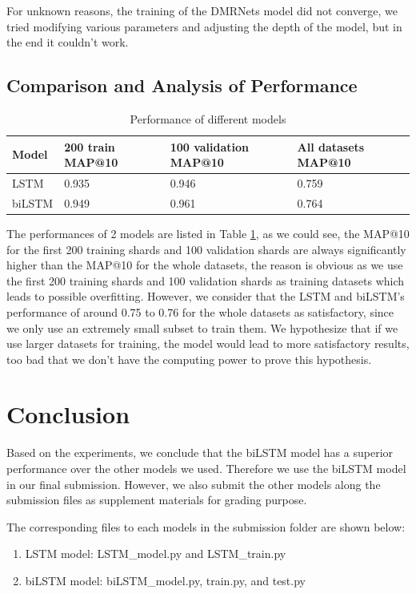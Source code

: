 \documentclass{article}
\begin{document}
For unknown reasons, the training of the DMRNets model did not converge, we tried modifying various parameters and adjusting the depth of the model, but in the end it couldn't work.

\subsection{Comparison and Analysis of Performance}
\begin{table} [H]
  \caption{Performance of different models}
  \label{table 1}
  \centering
  \begin{tabular}{llll}
    \toprule
    Model     & 200 train MAP@10     & 100 validation MAP@10 & All datasets MAP@10 \\
    \midrule 
LSTM & 0.935  & 0.946 & 0.759     \\
biLSTM     & 0.949 & 0.961 & 0.764      \\
    \bottomrule
  \end{tabular}
\end{table}
The performances of 2 models are listed in Table \ref{table 1}, as we could see, the MAP@10 for the first 200 training shards and 100 validation shards are always significantly higher than the MAP@10 for the whole datasets, the reason is obvious as we use the first 200 training shards and 100 validation shards as training datasets which leads to possible overfitting. However, we consider that the LSTM and biLSTM's performance of around 0.75 to 0.76 for the whole datasets as satisfactory, since we only use an extremely small subset to train them. We hypothesize that if we use larger datasets for training, the model would lead to more satisfactory results, too bad that we don't have the computing power to prove this hypothesis.

\section{Conclusion}
Based on the experiments, we conclude that the biLSTM model has a superior performance over the other models we used. Therefore we use the biLSTM model in our final submission. However, we also submit the other models along the submission files as supplement materials for grading purpose.

The corresponding files to each models in the submission folder are shown below:
\begin{enumerate}
\item LSTM model: LSTM\_model.py and LSTM\_train.py
\item biLSTM model: biLSTM\_model.py, train.py, and test.py
\end{enumerate}
\end{document}
